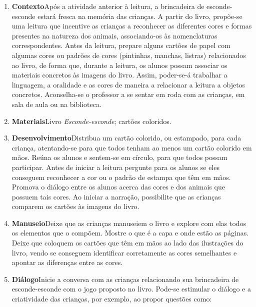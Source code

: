 \documentclass[11pt]{extarticle}
\begin{document}
\begin{enumerate}
\item \textbf{Contexto}\quad Após a atividade anterior à leitura, a brincadeira de esconde-esconde estará fresca na memória das crianças. A partir do livro, propõe-se uma leitura que incentive as crianças a reconhecer as diferentes cores e formas presentes na natureza dos animais, associando-os às nomenclaturas correspondentes. 
Antes da leitura, prepare alguns cartões de papel com algumas cores ou padrões de cores (pintinhas, manchas, listras) relacionados ao livro, de forma que, durante a leitura, os alunos possam associar os materiais concretos às imagens do livro.
Assim, poder-se-á trabalhar a linguagem, a oralidade e as cores de maneira a relacionar a leitura a objetos concretos. 
Aconselha-se o professor a se sentar em roda com as crianças, em sala de aula ou na biblioteca.


\item \textbf{Materiais}\quad Livro \textit{Esconde-esconde}; cartões coloridos.


\item \textbf{Desenvolvimento}\quad Distribua um cartão colorido, ou estampado, para cada criança, atentando-se para que todos tenham ao menos um cartão colorido em mãos. Reúna os alunos e sentem-se em círculo, para que todos possam participar. Antes de iniciar a leitura pergunte para os alunos se eles conseguem reconhecer a cor ou o padrão de estampa que têm em mãos. Promova o diálogo entre os alunos acerca das cores e dos animais que possuem tais cores. Ao iniciar a narração, possibilite que as crianças comparem os cartões às imagens do livro.
 
\item \textbf{Manuseio}\quad Deixe que as crianças manuseiem o livro 
e explore com elas todos os elementos que o compõem. Mostre o que é a 
capa e onde estão as páginas. Deixe que coloquem os cartões que têm em mãos ao lado das ilustrações do livro, vendo se conseguem identificar corretamente as cores semelhantes e apontar as diferenças entre as cores.


\item \textbf{Diálogo}\quad Inicie a conversa com as crianças relacionando sua brincadeira de esconde-esconde com o jogo proposto no livro. Pode-se estimular o diálogo e a criatividade das crianças, por exemplo, ao propor questões como:


\end{enumerate}
\end{document}
